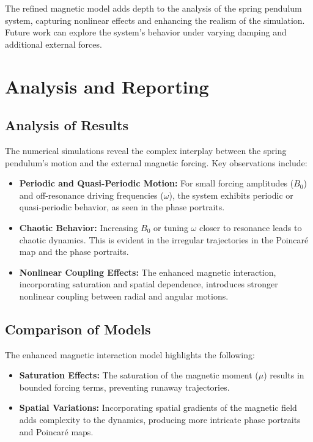 \documentclass[12pt]{article}
\begin{document}
The refined magnetic model adds depth to the analysis of the spring pendulum system, capturing nonlinear effects and enhancing the realism of the simulation. Future work can explore the system's behavior under varying damping and additional external forces.

\section{Analysis and Reporting}

\subsection{Analysis of Results}
The numerical simulations reveal the complex interplay between the spring pendulum's motion and the external magnetic forcing. Key observations include:
\begin{itemize}
    \item \textbf{Periodic and Quasi-Periodic Motion:} For small forcing amplitudes (\( B_0 \)) and off-resonance driving frequencies (\( \omega \)), the system exhibits periodic or quasi-periodic behavior, as seen in the phase portraits.
    \item \textbf{Chaotic Behavior:} Increasing \( B_0 \) or tuning \( \omega \) closer to resonance leads to chaotic dynamics. This is evident in the irregular trajectories in the Poincaré map and the phase portraits.
    \item \textbf{Nonlinear Coupling Effects:} The enhanced magnetic interaction, incorporating saturation and spatial dependence, introduces stronger nonlinear coupling between radial and angular motions.
\end{itemize}

\subsection{Comparison of Models}
The enhanced magnetic interaction model highlights the following:
\begin{itemize}
    \item \textbf{Saturation Effects:} The saturation of the magnetic moment (\( \mu \)) results in bounded forcing terms, preventing runaway trajectories.
    \item \textbf{Spatial Variations:} Incorporating spatial gradients of the magnetic field adds complexity to the dynamics, producing more intricate phase portraits and Poincaré maps.
\end{itemize}
\end{document}

